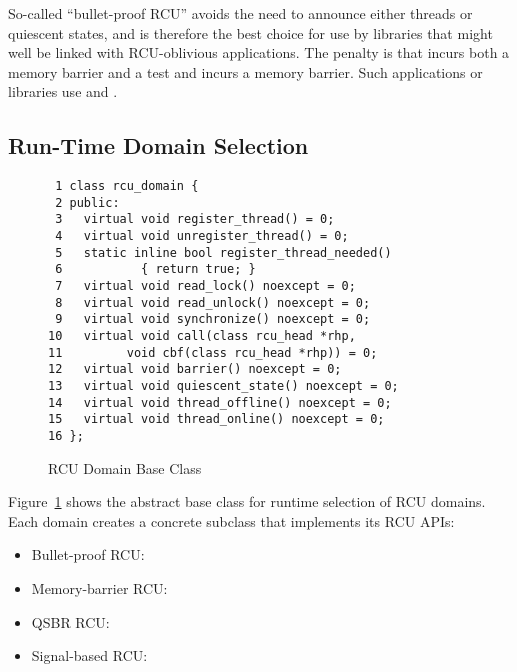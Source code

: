 \documentclass[letterpaper,twocolumn,10pt]{article}
\begin{document}
So-called ``bullet-proof RCU'' avoids the need to announce either threads
or quiescent states, and is therefore the best choice for use by
libraries that might well be linked with RCU-oblivious applications.
The penalty is that  incurs both a memory barrier
and a test and  incurs a memory barrier.
Such applications or libraries use  and
.

\subsection{Run-Time Domain Selection}
\label{sec:Run-Time Domain Selection}

\begin{figure}[tbp]
{ \scriptsize
\begin{verbatim}
 1 class rcu_domain {
 2 public:
 3   virtual void register_thread() = 0;
 4   virtual void unregister_thread() = 0;
 5   static inline bool register_thread_needed()
 6           { return true; }
 7   virtual void read_lock() noexcept = 0;
 8   virtual void read_unlock() noexcept = 0;
 9   virtual void synchronize() noexcept = 0;
10   virtual void call(class rcu_head *rhp,
11         void cbf(class rcu_head *rhp)) = 0;
12   virtual void barrier() noexcept = 0;
13   virtual void quiescent_state() noexcept = 0;
14   virtual void thread_offline() noexcept = 0;
15   virtual void thread_online() noexcept = 0;
16 };
\end{verbatim}
}
\caption{RCU Domain Base Class}
\label{fig:RCU Domain Base Class}
\end{figure}

Figure~\ref{fig:RCU Domain Base Class}
shows the abstract base class for runtime selection of RCU domains.
Each domain creates a concrete subclass that implements its RCU APIs:

\begin{itemize}
\item	Bullet-proof RCU: 
\item	Memory-barrier RCU: 
\item	QSBR RCU: 
\item	Signal-based RCU: 
\end{itemize}

\end{document}
